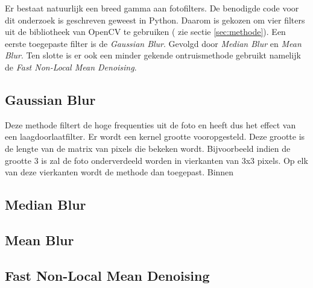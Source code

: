 Er bestaat natuurlijk een breed gamma aan fotofilters. De benodigde code voor dit onderzoek is geschreven geweest in Python. Daarom is gekozen om vier filters uit de bibliotheek van OpenCV te gebruiken ( zie sectie \ref{sec:methode}).  Een eerste toegepaste filter is de \textit{Gaussian Blur}. Gevolgd door \textit{Median Blur} en \textit{Mean Blur}. Ten slotte is er ook een minder gekende ontruismethode gebruikt namelijk de \textit{Fast Non-Local Mean Denoising}.

\subsection{Gaussian Blur}
Deze methode filtert de hoge frequenties uit de foto en heeft dus het effect van een laagdoorlaatfilter. Er wordt een kernel grootte vooropgesteld. Deze grootte is de lengte van de matrix van pixels die bekeken wordt. Bijvoorbeeld indien de grootte 3 is zal de foto onderverdeeld worden in vierkanten van 3x3 pixels. Op elk van deze vierkanten wordt de methode dan toegepast. Binnen 
\subsection{Median Blur}

\subsection{Mean Blur}

\subsection{Fast Non-Local Mean Denoising}
